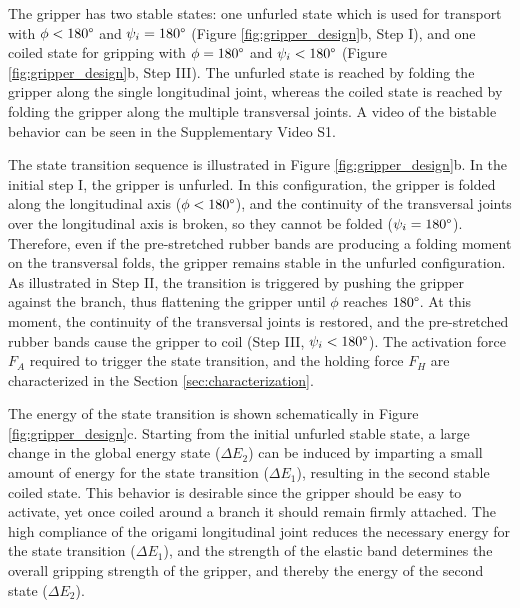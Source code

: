 The gripper has two stable states: one unfurled state which is used for transport with $\phi<180\degree$ and $\psi_i=180\degree$ (Figure \ref{fig:gripper_design}b, Step I), and one coiled state for gripping with $\phi=180\degree$ and $\psi_i<180\degree$ (Figure \ref{fig:gripper_design}b, Step III). The unfurled state is reached by folding the gripper along the single longitudinal joint, whereas the coiled state is reached by folding the gripper along the multiple transversal joints.  A video of the bistable behavior can be seen in the Supplementary Video S1.

The state transition sequence is illustrated in Figure \ref{fig:gripper_design}b. In the initial step I, the gripper is unfurled. In this configuration, the gripper is folded along the longitudinal axis ($\phi < 180\degree$), and the continuity of the transversal joints over the longitudinal axis is broken, so they cannot be folded ($\psi_i = 180\degree$). Therefore, even if the pre-stretched rubber bands are producing a folding moment on the transversal folds, the gripper remains stable in the unfurled configuration. As illustrated in Step II, the transition is triggered by pushing the gripper against the branch, thus flattening the gripper until $\phi$ reaches $180\degree$. At this moment, the continuity of the transversal joints is restored, and the pre-stretched rubber bands cause the gripper to coil (Step III, $\psi_i < 180\degree$). The activation force $F_A$ required to trigger the state transition, and the holding force $F_H$ are characterized in the Section \ref{sec:characterization}.

The energy of the state transition is shown schematically in Figure \ref{fig:gripper_design}c. Starting from the initial unfurled stable state, a large change in the global energy state ($\Delta E_2$) can be induced by imparting a small amount of energy for the state transition ($\Delta E_1$), resulting in the second stable coiled state.
This behavior is desirable since the gripper should be easy to activate, yet once coiled around a branch it should remain firmly attached. The high compliance of the origami longitudinal joint reduces the necessary energy for the state transition ($\Delta E_1$), and the strength of the elastic band determines the overall gripping strength of the gripper, and thereby the energy of the second state ($\Delta E_2$). 


